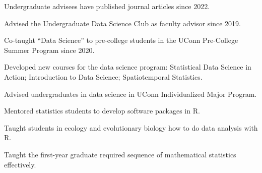 \documentclass[Statistics]{vita}
\begin{document}
\begin{vita}
\begin{TeachingAccomplishments}
    \begin{TeachingHighlights}
    \item Undergraduate advisees have published journal articles since 2022.
    \item Advised the Undergraduate Data Science Club as faculty advisor since 2019.
    \item Co-taught ``Data Science'' to pre-college students in the UConn Pre-College Summer Program since 2020.
    \item Developed new courses for the data science program: Statistical Data Science in Action; Introduction to Data Science; Spatiotemporal Statistics.
    \item Advised undergraduates in data science in UConn Individualized Major Program.
    \item Mentored statistics students to develop software packages in R.
    \item Taught students in ecology and evolutionary biology how to do data analysis with R.
    \item Taught the first-year graduate required sequence of mathematical statistics effectively.
    \end{TeachingHighlights}
  \end{TeachingAccomplishments}

\end{vita}
\end{document}
